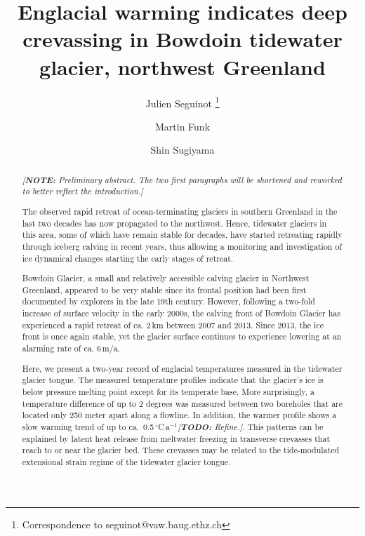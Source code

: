\documentclass[utf8]{article}
\title{Englacial warming indicates deep crevassing in Bowdoin tidewater
       glacier, northwest Greenland}
\author[1]{Julien Seguinot
           \thanks{Correspondence to seguinot@vaw.baug.ethz.ch}}
\author[1]{Martin Funk}
\author[2]{Shin Sugiyama}
\affil[1]{Laboratory of Hydraulics, Hydrology and Glaciology,
          ETH Zürich, Switzerland}
\affil[2]{Institute of Low Temperature Science,
          Hokkaido University, Sapporo, Japan}
\newcommand{\note}[1]{\textcolor{c0}{\emph{[\textbf{NOTE:} #1]}}}
\newcommand{\todo}[1]{\textcolor{c3}{\emph{[\textbf{TODO:} #1]}}}
\begin{document}

\maketitle

\begin{abstract}

    \note{Preliminary abstract. The two first paragraphs will be shortened and
          reworked to better reflect the introduction.}

    The observed rapid retreat of ocean-terminating glaciers in southern
    Greenland in the last two decades has now propagated to the northwest.
    Hence, tidewater glaciers in this area, some of which have remain stable
    for decades, have started retreating rapidly through iceberg calving in
    recent years, thus allowing a monitoring and investigation of ice dynamical
    changes starting the early stages of retreat.

    Bowdoin Glacier, a small and relatively accessible calving glacier in
    Northwest Greenland, appeared to be very stable since its frontal position
    had been first documented by explorers in the late 19th century. However,
    following a two-fold increase of surface velocity in the early 2000s, the
    calving front of Bowdoin Glacier has experienced a rapid retreat of ca.
    2\,km between 2007 and 2013. Since 2013, the ice front is once again
    stable, yet the glacier surface continues to experience lowering at an
    alarming rate of ca. 6\,m/a.

    Here, we present a two-year record of englacial temperatures measured in
    the tidewater glacier tongue. The measured temperature profiles indicate
    that the glacier's ice is below pressure melting point except for its
    temperate base. More surprisingly, a temperature difference of up to 2
    degrees was measured between two boreholes that are located only 250 meter
    apart along a flowline. In addition, the warmer profile shows a slow
    warming trend of up to ca.~0.5\,$^\circ$C\,a$^{-1}$\todo{Refine.}. This
    patterns can be explained by latent heat release from meltwater freezing in
    transverse crevasses that reach to or near the glacier bed. These crevasses
    may be related to the tide-modulated extensional strain regime of the
    tidewater glacier tongue.

\end{abstract}
\end{document}

